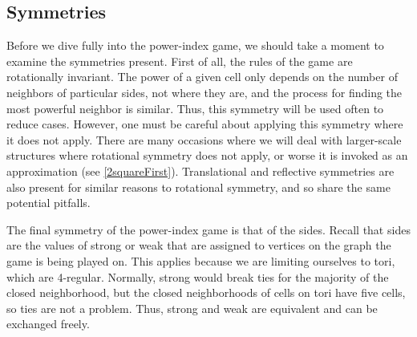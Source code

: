 \documentclass[12pt]{article}
\theoremstyle{definition}
\theoremstyle{remark}
\theoremstyle{remark}
\begin{document}
	
	
\subsection{Symmetries}

\par
Before we dive fully into the power-index game, we should take a moment to examine the symmetries present. First of all, the rules of the game are rotationally invariant. The power of a given cell only depends on the number of neighbors of particular sides,
not where they are, and the %
process for finding the most powerful neighbor is similar. Thus, this symmetry will be used often to reduce cases. However, one must be careful about applying this symmetry where it does not apply. There are many occasions where we will deal with larger-scale structures where rotational symmetry does not apply, or worse it is invoked as an approximation (see \ref{2squareFirst}). Translational and reflective symmetries are also present for similar reasons to rotational symmetry, and so share the same potential pitfalls.

\par
The final symmetry of the power-index game is that of the sides. Recall that sides are the values of strong or weak that are assigned to vertices on the graph the game is being played on. This applies because we are limiting ourselves to tori, which are 4-regular. Normally, strong would break ties for the majority of the closed neighborhood, but the closed neighborhoods of cells on tori have five cells, so ties are not a problem. Thus, strong and weak are equivalent and can be exchanged freely.
\end{document}

